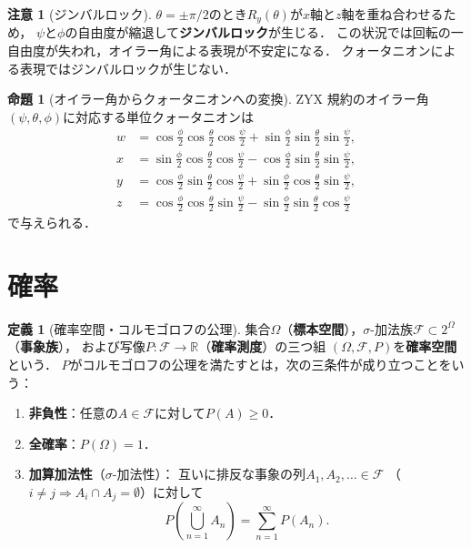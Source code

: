 \documentclass[dvipdfmx,a4paper,12pt]{jsarticle}
\theoremstyle{definition}
\newtheorem{definition}[theorem]{定義}
\newtheorem{proposition}[theorem]{命題}
\newtheorem{remark}[theorem]{注意}
\begin{document}
\begin{remark}[ジンバルロック]
    $\theta=\pm\pi/2$のとき$R_y(\theta)$が$x$軸と$z$軸を重ね合わせるため，
    $\psi$と$\phi$の自由度が縮退して\textbf{ジンバルロック}が生じる．
    この状況では回転の一自由度が失われ，オイラー角による表現が不安定になる．
    クォータニオンによる表現ではジンバルロックが生じない．
\end{remark}

\begin{proposition}[オイラー角からクォータニオンへの変換]
    ZYX 規約のオイラー角$(\psi,\theta,\phi)$に対応する単位クォータニオンは
    \begin{align*}
        w &= \cos\tfrac{\phi}{2}\cos\tfrac{\theta}{2}\cos\tfrac{\psi}{2}
           +\sin\tfrac{\phi}{2}\sin\tfrac{\theta}{2}\sin\tfrac{\psi}{2},\\
        x &= \sin\tfrac{\phi}{2}\cos\tfrac{\theta}{2}\cos\tfrac{\psi}{2}
           -\cos\tfrac{\phi}{2}\sin\tfrac{\theta}{2}\sin\tfrac{\psi}{2},\\
        y &= \cos\tfrac{\phi}{2}\sin\tfrac{\theta}{2}\cos\tfrac{\psi}{2}
           +\sin\tfrac{\phi}{2}\cos\tfrac{\theta}{2}\sin\tfrac{\psi}{2},\\
        z &= \cos\tfrac{\phi}{2}\cos\tfrac{\theta}{2}\sin\tfrac{\psi}{2}
           -\sin\tfrac{\phi}{2}\sin\tfrac{\theta}{2}\cos\tfrac{\psi}{2}
    \end{align*}
    で与えられる．
\end{proposition}

\section{確率}

\begin{definition}[確率空間・コルモゴロフの公理]
    集合$\Omega$（\textbf{標本空間}），$\sigma$-加法族$\mathcal{F}\subset 2^\Omega$（\textbf{事象族}），
    および写像$P\colon\mathcal{F}\to\mathbb{R}$（\textbf{確率測度}）の三つ組
    $(\Omega,\mathcal{F},P)$を\textbf{確率空間}という．
    $P$がコルモゴロフの公理を満たすとは，次の三条件が成り立つことをいう：
    \begin{enumerate}
        \item \textbf{非負性}：任意の$A\in\mathcal{F}$に対して$P(A)\geq 0$．
        \item \textbf{全確率}：$P(\Omega)=1$．
        \item \textbf{加算加法性}（$\sigma$-加法性）：
        互いに排反な事象の列$A_1,A_2,\ldots\in\mathcal{F}$
        （$i\neq j\Rightarrow A_i\cap A_j=\emptyset$）に対して
        $$P\!\left(\bigcup_{n=1}^{\infty}A_n\right)=\sum_{n=1}^{\infty}P(A_n).$$
    \end{enumerate}
\end{definition}
\end{document}
